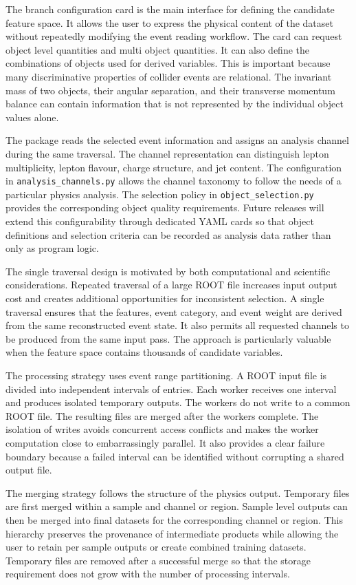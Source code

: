 \documentclass[11pt,a4paper]{article}
\begin{document}
The branch configuration card is the main interface for defining the candidate
feature space. It allows the user to express the physical content of the dataset
without repeatedly modifying the event reading workflow. The card can request
object level quantities and multi object quantities. It can also define the
combinations of objects used for derived variables. This is important because
many discriminative properties of collider events are relational. The invariant
mass of two objects, their angular separation, and their transverse momentum
balance can contain information that is not represented by the individual object
values alone.

The package reads the selected event information and assigns an analysis channel
during the same traversal. The channel representation can distinguish lepton
multiplicity, lepton flavour, charge structure, and jet content. The
configuration in \texttt{analysis\_channels.py} allows the channel taxonomy to
follow the needs of a particular physics analysis. The selection policy in
\texttt{object\_selection.py} provides the corresponding object quality
requirements. Future releases will extend this configurability through dedicated
YAML cards so that object definitions and selection criteria can be recorded as
analysis data rather than only as program logic.

The single traversal design is motivated by both computational and scientific
considerations. Repeated traversal of a large ROOT file increases input output
cost and creates additional opportunities for inconsistent selection. A single
traversal ensures that the features, event category, and event weight are derived
from the same reconstructed event state. It also permits all requested channels
to be produced from the same input pass. The approach is particularly valuable
when the feature space contains thousands of candidate variables.

The processing strategy uses event range partitioning. A ROOT input file is
divided into independent intervals of entries. Each worker receives one interval
and produces isolated temporary outputs. The workers do not write to a common
ROOT file. The resulting files are merged after the workers complete. The
isolation of writes avoids concurrent access conflicts and makes the worker
computation close to embarrassingly parallel. It also provides a clear failure
boundary because a failed interval can be identified without corrupting a shared
output file.

The merging strategy follows the structure of the physics output. Temporary
files are first merged within a sample and channel or region. Sample level
outputs can then be merged into final datasets for the corresponding channel or
region. This hierarchy preserves the provenance of intermediate products while
allowing the user to retain per sample outputs or create combined training
datasets. Temporary files are removed after a successful merge so that the
storage requirement does not grow with the number of processing intervals.
\end{document}
